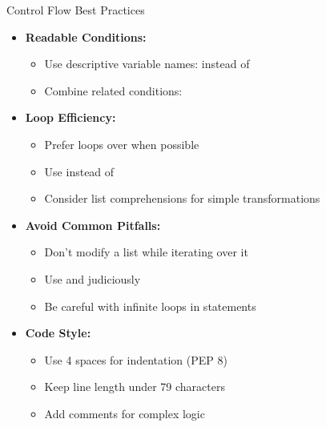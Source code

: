 \begin{frame}{Control Flow Best Practices}
    \begin{itemize}
        \item \textbf{Readable Conditions:}
        \begin{itemize}
            \item Use descriptive variable names:  instead of 
            \item Combine related conditions: 
        \end{itemize}
        
        \item \textbf{Loop Efficiency:}
        \begin{itemize}
            \item Prefer  loops over  when possible
            \item Use  instead of 
            \item Consider list comprehensions for simple transformations
        \end{itemize}
        
        \item \textbf{Avoid Common Pitfalls:}
        \begin{itemize}
            \item Don't modify a list while iterating over it
            \item Use  and  judiciously
            \item Be careful with infinite loops in  statements
        \end{itemize}
        
        \item \textbf{Code Style:}
        \begin{itemize}
            \item Use 4 spaces for indentation (PEP 8)
            \item Keep line length under 79 characters
            \item Add comments for complex logic
        \end{itemize}
    \end{itemize}
\end{frame}
